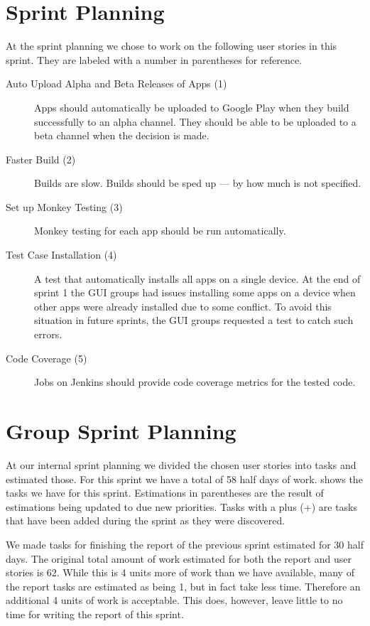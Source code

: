 \section{\bdtitle Sprint Planning}\label{sec:S2_bd}
At the \bd sprint planning we chose to work on the following user stories in this sprint. They are labeled with a number in parentheses for reference.

\begin{description}
  \item[Auto Upload Alpha and Beta Releases of Apps (1)] Apps should automatically be uploaded to Google Play when they build successfully to an alpha channel. They should be able to be uploaded to a beta channel when the decision is made. 
  \item[Faster Build (2)] Builds are slow. Builds should be sped up --- by how much is not specified.
  \item[Set up Monkey Testing (3)] Monkey testing for each app should be run automatically.
  \item[Test Case Installation (4)] A test that automatically installs all apps on a single device. At the end of sprint 1 the GUI groups had issues installing some apps on a device when other apps were already installed due to some conflict. To avoid this situation in future sprints, the GUI groups requested a test to catch such errors.
  \item[Code Coverage (5)] Jobs on Jenkins should provide code coverage metrics for the tested code.
\end{description}

\section{Group Sprint Planning}\label{sec:S2_group}
At our internal sprint planning we divided the chosen user stories into tasks and estimated those. For this sprint we have a total of 58 half days of work.  shows the tasks we have for this sprint. Estimations in parentheses are the result of estimations being updated to due new priorities. Tasks with a plus (+) are tasks that have been added during the sprint as they were discovered.

We made tasks for finishing the report of the previous sprint estimated for 30 half days. The original total amount of work estimated for both the report and user stories is 62. While this is 4 units more of work than we have available, many of the report tasks are estimated as being 1, but in fact take less time. Therefore an additional 4 units of work is acceptable. This does, however, leave little to no time for writing the report of this sprint.

